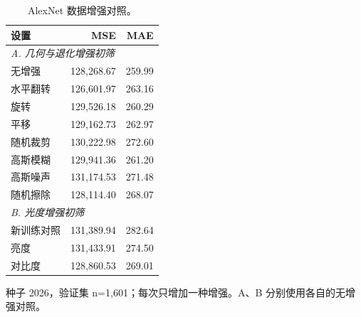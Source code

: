 \begin{table}[t]
\centering
\caption{AlexNet 数据增强对照。}
\label{tab:augmentation-zh}
\small
\setlength{\tabcolsep}{3pt}
\begin{tabular*}{\columnwidth}{@{\extracolsep{\fill}}lrr@{}}
\hline
设置 & MSE & MAE \\
\hline
\multicolumn{3}{l}{\emph{A. 几何与退化增强初筛}} \\
无增强 & 128,268.67 & 259.99 \\
水平翻转 & 126,601.97 & 263.16 \\
旋转 & 129,526.18 & 260.29 \\
平移 & 129,162.73 & 262.97 \\
随机裁剪 & 130,222.98 & 272.60 \\
高斯模糊 & 129,941.36 & 261.20 \\
高斯噪声 & 131,174.53 & 271.48 \\
随机擦除 & 128,114.40 & 268.07 \\
\multicolumn{3}{l}{\emph{B. 光度增强初筛}} \\
新训练对照 & 131,389.94 & 282.64 \\
亮度 & 131,433.91 & 274.50 \\
对比度 & 128,860.53 & 269.01 \\
\hline
\end{tabular*}
\par\smallskip
\begin{minipage}{\columnwidth}\scriptsize
种子 2026，验证集 n=1,601；每次只增加一种增强。A、B 分别使用各自的无增强对照。
\end{minipage}
\end{table}
